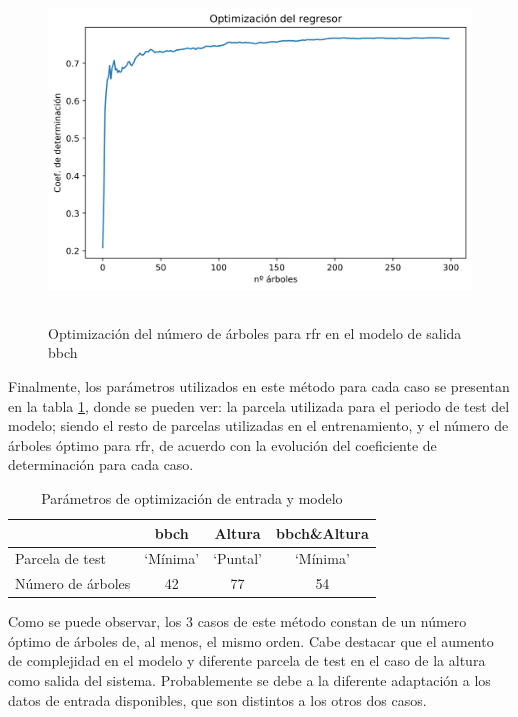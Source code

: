 \begin{figure}[h]
    \centering
    \includegraphics[height=9cm]{archivos/tfg/Mean/opt_tree_bbch_mean} 
    \caption{Optimización del número de árboles para \gls{rfr} en el modelo de salida \gls{bbch}\label{fig:opt_parcl}}
    
\end{figure}

\par Finalmente, los parámetros utilizados en este método para cada caso se presentan en la tabla \ref{tab:opt_parcl}, donde se pueden ver: la parcela utilizada para el periodo de test del modelo; siendo el resto de parcelas utilizadas en el entrenamiento, y el número de árboles óptimo para \gls{rfr}, de acuerdo con la evolución del coeficiente de determinación para cada caso.

\begin{table}[h]
\centering
\begin{tabular}{l|ccc}
                  & \gls{bbch}     & Altura   & \gls{bbch}\&Altura \\ \hline
Parcela de test   & `Mínima' & `Puntal' & `Mínima'     \\
Número de árboles & 42       & 77       & 54          
\end{tabular}
\caption{Parámetros de optimización de entrada y modelo
\label{tab:opt_parcl}}
\end{table}

\par Como se puede observar, los 3 casos de este método constan de un número óptimo de árboles de, al menos, el mismo orden. Cabe destacar que el aumento de complejidad en el modelo y diferente parcela de test en el caso de la altura como salida del sistema. Probablemente se debe a la diferente adaptación a los datos de entrada disponibles, que son distintos a los otros dos casos.  
